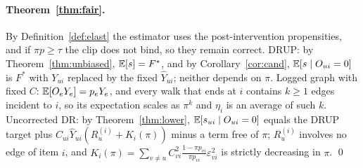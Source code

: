 \paragraph{Theorem~\ref{thm:fair}.}
By Definition~\ref{def:elast} the estimator uses the post-intervention
propensities, and if $\pi p\ge\tau$ the clip does not bind, so they remain
correct. DRUP: by Theorem~\ref{thm:unbiased}, $\mathbb{E}[s]=F^*$,
and by Corollary~\ref{cor:cand}, $\mathbb{E}[s\mid O_{ui}=0]$ is $F^*$ with $Y_{ui}$ replaced by
the fixed $\hat Y_{ui}$; neither depends on $\pi$. Logged graph with fixed $C$: $\mathbb{E}[O_eY_e]=p_eY_e$,
and every walk that ends at $i$ contains $k\ge1$ edges incident to $i$, so its
expectation scales as $\pi^k$ and $\eta_i$ is an average of such $k$. Uncorrected
DR: by Theorem~\ref{thm:lower}, $\mathbb{E}[s_{ui}\mid O_{ui}=0]$ equals the DRUP target plus
$C_{ui}\hat Y_{ui}(R_u^{(i)}+K_i(\pi))$ minus a term free of $\pi$; $R_u^{(i)}$ involves
no edge of item $i$, and $K_i(\pi)=\sum_{v\ne u}C_{vi}^2\frac{1-\pi p_{vi}}{\pi p_{vi}}\varepsilon_{vi}^2$ is
strictly decreasing in $\pi$. \qed
